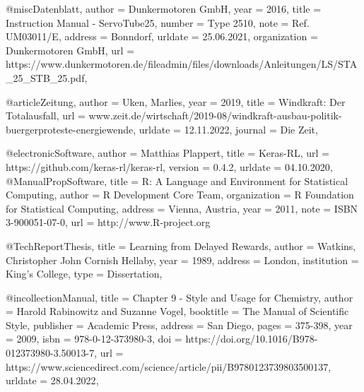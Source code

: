 @misc{Datenblatt,
 author = {{Dunkermotoren GmbH}},
 year = {2016},
 title = {Instruction Manual - ServoTube25},
 number       = {Type 2510},
 note         = {Ref. UM03011/E},
 address = {Bonndorf},
 urldate = {25.06.2021},
 organization = {Dunkermotoren GmbH},
 url = {https://www.dunkermotoren.de/fileadmin/files/downloads/Anleitungen/LS/STA_25_STB_25.pdf},
}

@article{Zeitung,
 author = {Uken, Marlies},
 year = {2019},
 title = {Windkraft: Der Totalausfall},
 url = {www.zeit.de/wirtschaft/2019-08/windkraft-ausbau-politik-buergerproteste-energiewende},
 urldate = {12.11.2022},
 journal = {Die Zeit},
}

@electronic{Software,
    author = {Matthias Plappert},
    title = {Keras-RL},
    url = {https://github.com/keras-rl/keras-rl},
    version = {0.4.2},
    urldate = {04.10.2020},
}
@Manual{PropSoftware,
title = {R: A Language and Environment for Statistical Computing},
author = {R Development Core Team},
organization = {R Foundation for Statistical Computing},
address = {Vienna, Austria},
year = 2011,
note = {{ISBN} 3-900051-07-0},
url = {http://www.R-project.org}
} 

@TechReport{Thesis,
 title = {Learning from Delayed Rewards},
 author = {Watkins, Christopher John Cornish Hellaby},
 year = {1989},
 address = {London},
 institution = {{King's College}},
 type = {Dissertation},
}


@incollection{Manual,
title = {Chapter 9 - Style and Usage for Chemistry},
author = {Harold Rabinowitz and Suzanne Vogel},
booktitle = {The Manual of Scientific Style},
publisher = {Academic Press},
address = {San Diego},
pages = {375-398},
year = {2009},
isbn = {978-0-12-373980-3},
doi = {https://doi.org/10.1016/B978-012373980-3.50013-7},
url = {https://www.sciencedirect.com/science/article/pii/B9780123739803500137},
urldate = {28.04.2022},
}

